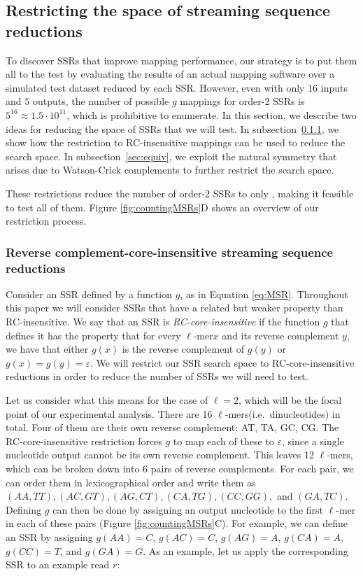 \documentclass[
  11pt,
  twoside,
  BCOR=10mm,
  listof=totoc]{scrbook}
\begin{document}
\hypertarget{sec:enum}{%
\subsection{Restricting the space of streaming sequence reductions}\label{sec:enum}}

To discover SSRs that improve mapping performance, our strategy is to put them all to the test by evaluating the results of an actual mapping software over a simulated test dataset reduced by each SSR. However, even with only \(16\) inputs and \(5\) outputs, the number of possible \(g\) mappings for order-2 SSRs is \(5^{16}\approx 1.5\cdot10^{11}\), which is prohibitive to enumerate. In this section, we describe two ideas for reducing the space of SSRs that we will test. In subsection~\ref{sec:rc-insensitive}, we show how the restriction to RC-insensitive mappings can be used to reduce the search space. In subsection~\ref{sec:equiv}, we exploit the natural symmetry that arises due to Watson-Crick complements to further restrict the search space.

These restrictions reduce the number of order-2 SSRs to only , making it feasible to test all of them. Figure \ref{fig:countingMSRs}D shows an overview of our restriction process.

\hypertarget{sec:rc-insensitive}{%
\subsubsection{Reverse complement-core-insensitive streaming sequence reductions}\label{sec:rc-insensitive}}

Consider an SSR defined by a function \(g\), as in Equation \eqref{eq:MSR}. Throughout this paper we will consider SSRs that have a related but weaker property than RC-insensitive. We say that an SSR is \emph{RC-core-insensitive} if the function \(g\) that defines it has the property that for every \(\ell\)-mer\(x\) and its reverse complement \(y\), we have that either \(g(x)\) is the reverse complement of \(g(y)\) or \(g(x) = g(y) = \varepsilon\). We will restrict our SSR search space to RC-core-insensitive reductions in order to reduce the number of SSRs we will need to test.

Let us consider what this means for the case of \(\ell=2\), which will be the focal point of our experimental analysis. There are 16 \(\ell\)-mers(i.e.~dinucleotides) in total. Four of them are their own reverse complement: AT, TA, GC, CG. The RC-core-insensitive restriction forces \(g\) to map each of these to \(\varepsilon\), since a single nucleotide output cannot be its own reverse complement. This leaves 12 \(\ell\)-mers, which can be broken down into 6 pairs of reverse complements. For each pair, we can order them in lexicographical order and write them as \((AA,TT), (AC,GT), (AG,CT), (CA,TG), (CC,GG),\) and \((GA,TC)\). Defining \(g\) can then be done by assigning an output nucleotide to the first \(\ell\)-mer in each of these pairs (Figure \ref{fig:countingMSRs}C). For example, we can define an SSR by assigning \(g(AA) = C\), \(g(AC) = C\), \(g(AG) = A\), \(g(CA) = A\), \(g(CC) = T\), and \(g(GA) = G\). As an example, let us apply the corresponding SSR to an example read \(r\):
\end{document}
